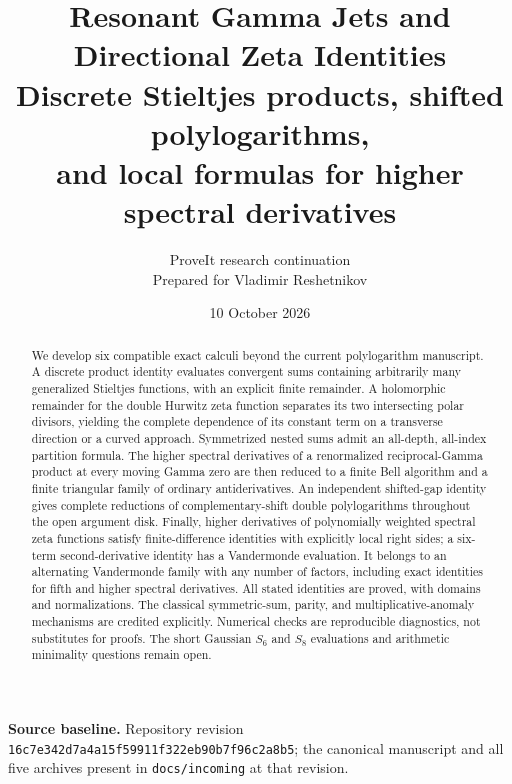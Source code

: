 \documentclass[11pt,letterpaper]{article}
\title{Resonant Gamma Jets and Directional Zeta Identities\\[7pt]
\large Discrete Stieltjes products, shifted polylogarithms,\\
and local formulas for higher spectral derivatives}
\author{ProveIt research continuation\\\small Prepared for Vladimir Reshetnikov}
\date{10 October 2026}
\numberwithin{equation}{section}
\theoremstyle{plain}
\theoremstyle{definition}
\theoremstyle{remark}
\newcommand{\src}[1]{\nolinkurl{#1}}
\begin{document}
\maketitle
\begin{abstract}
We develop six compatible exact calculi beyond the current polylogarithm
manuscript. A discrete product identity evaluates convergent sums containing
arbitrarily many generalized Stieltjes functions, with an explicit finite
remainder. A holomorphic remainder for the double Hurwitz zeta function
separates its two intersecting polar divisors, yielding the complete
dependence of its constant term on a transverse direction or a curved
approach. Symmetrized nested sums admit an all-depth, all-index partition
formula. The higher spectral derivatives of a renormalized reciprocal-Gamma
product at every moving Gamma zero are then reduced to a finite Bell
algorithm and a finite triangular family of ordinary antiderivatives.
An independent shifted-gap identity gives complete reductions of
complementary-shift double polylogarithms throughout the open argument
disk. Finally, higher derivatives of polynomially weighted spectral zeta
functions satisfy finite-difference identities with explicitly local right
sides; a six-term second-derivative identity has a Vandermonde evaluation.
It belongs to an alternating Vandermonde family with any number of factors,
including exact identities for fifth and higher spectral derivatives.
All stated identities are proved, with domains and normalizations. The
classical symmetric-sum, parity, and multiplicative-anomaly mechanisms are
credited explicitly. Numerical checks are reproducible diagnostics, not
substitutes for proofs. The short Gaussian $S_6$ and $S_8$ evaluations and
arithmetic minimality questions remain open.
\end{abstract}
\vspace{5pt}
\noindent\textbf{Source baseline.} Repository revision
\src{16c7e342d7a4a15f59911f322eb90b7f96c2a8b5}; the canonical manuscript and
all five archives present in \src{docs/incoming} at that revision.
\clearpage
\tableofcontents
\clearpage









\end{document}
